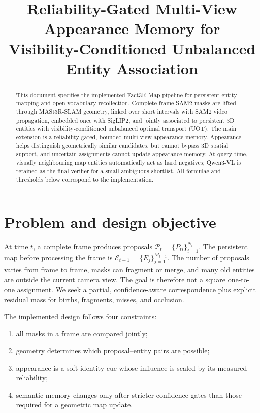 \documentclass[11pt]{article}
\title{Reliability-Gated Multi-View Appearance Memory for\\
Visibility-Conditioned Unbalanced Entity Association}
\author{}
\date{}
\newcommand{\1}{\bm{1}}
\begin{document}
\maketitle

\begin{abstract}
This document specifies the implemented Fact3R-Map pipeline for persistent
entity mapping and open-vocabulary recollection. Complete-frame SAM2 masks are
lifted through MASt3R-SLAM geometry, linked over short intervals with SAM2 video
propagation, embedded once with SigLIP2, and jointly associated to persistent 3D
entities with visibility-conditioned unbalanced optimal transport (UOT). The
main extension is a reliability-gated, bounded multi-view appearance memory.
Appearance helps distinguish geometrically similar candidates, but cannot
bypass 3D spatial support, and uncertain assignments cannot update appearance
memory. At query time, visually neighbouring map entities automatically act as
hard negatives; Qwen3-VL is retained as the final verifier for a small ambiguous
shortlist. All formulae and thresholds below correspond to the implementation.
\end{abstract}

\section{Problem and design objective}

At time $t$, a complete frame produces proposals
$\mathcal{P}_t=\{P_{ti}\}_{i=1}^{N_t}$. The persistent map before processing the
frame is $\mathcal{E}_{t-1}=\{E_j\}_{j=1}^{M_{t-1}}$. The number of proposals
varies from frame to frame, masks can fragment or merge, and many old entities
are outside the current camera view. The goal is therefore not a square
one-to-one assignment. We seek a partial, confidence-aware correspondence plus
explicit residual mass for births, fragments, misses, and occlusion.

The implemented design follows four constraints:
\begin{enumerate}[leftmargin=*]
    \item all masks in a frame are compared jointly;
    \item geometry determines which proposal--entity pairs are possible;
    \item appearance is a soft identity cue whose influence is scaled by its
          measured reliability;
    \item semantic memory changes only after stricter confidence gates than
          those required for a geometric map update.
\end{enumerate}
\end{document}
